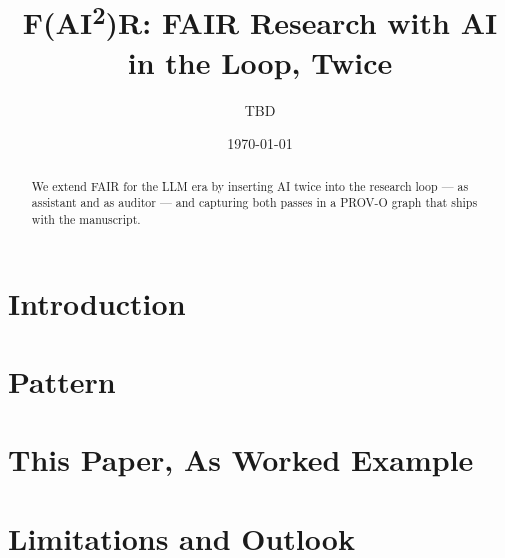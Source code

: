 \documentclass[10pt,a4paper,twocolumn]{article}
\title{F(AI\textsuperscript{2})R: FAIR Research with AI in the Loop, Twice}
\author{TBD}
\date{\today}
\begin{document}
\maketitle

\begin{abstract}
We extend FAIR for the LLM era by inserting AI twice into the research
loop --- as assistant and as auditor --- and capturing both passes in a
PROV-O graph that ships with the manuscript.
\end{abstract}

\section{Introduction}


\section{Pattern}


\section{This Paper, As Worked Example}


\section{Limitations and Outlook}


\printbibliography
\end{document}
